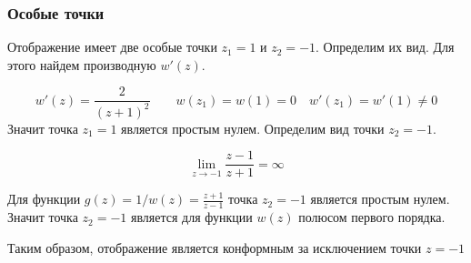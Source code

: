 \begin{frame}\frametitle{Особые точки}
	Отображение имеет две особые точки \(z_1 = 1\) и \(z_2 = -1\).
	Определим их вид.
	Для этого найдем производную \(w'(z)\).

	\[
		w'(z) = \frac{2}{(z+1)^2}
		\qquad
		w(z_1) = w(1) = 0
		\quad
		w'(z_1) = w'(1) \neq 0
	\]
	Значит точка \(z_1 = 1\) является простым нулем.
	Определим вид точки \(z_2 = -1\).

	\[ \lim_{z \to -1} \frac{z-1}{z+1} = \infty \]

	Для функции \(g(z) = 1/w(z) = \frac{z+1}{z-1}\)
	точка \(z_2 = -1\) является простым нулем.
	Значит точка \(z_2 = -1\) является для функции \(w(z)\) полюсом первого порядка.

	Таким образом, отображение является конформным за исключением точки \(z = -1\)
\end{frame}
